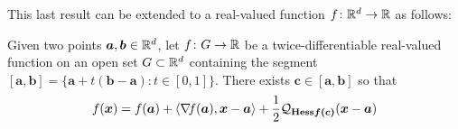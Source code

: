 This last result can be extended to a real-valued function $f \colon \mathbb{R}^d \to \mathbb{R}$ as follows:

\begin{theorem}\label{theorem:ELMd}
Given two points $\boldsymbol{a}, \boldsymbol{b} \in \mathbb{R}^d$, let $f\colon G \to \mathbb{R}$ be a twice-differentiable real-valued function on an open set $G \subset \mathbb{R}^d$ containing the segment $[\boldsymbol{a}, \boldsymbol{b}] = \{ \boldsymbol{a} + t (\boldsymbol{b} - \boldsymbol{a}) : t \in [0,1] \}$.  There exists $\boldsymbol{c} \in [\boldsymbol{a}, \boldsymbol{b}]$ so that 
\begin{equation*}
f(\boldsymbol{x}) = f(\boldsymbol{a}) + \langle \mathop{\nabla\! {f}}(\boldsymbol{a}), \boldsymbol{x} - \boldsymbol{a} \rangle + \frac{1}{2} \mathcal{Q}_{\boldsymbol{\mathop{\mathrm{Hess}{f}}(c)}} (\boldsymbol{x}-\boldsymbol{a})
\end{equation*}
\end{theorem}






